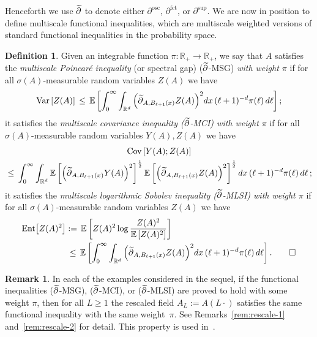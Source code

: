 \documentclass[11pt]{article}
\theoremstyle{definition}
\newtheorem{defi}[theo]{Definition}
\newtheorem{rema}[theo]{Remark}
\numberwithin{equation}{section}
\numberwithin{figure}{section}
\numberwithin{table}{section}
\newcommand{\R}{\mathbb R}
\newcommand{\expec}[1]{\mathbb{E}\left[#1 \right]}
\newcommand{\parfct}[1]{\partial_{#1}^{\operatorname{fct}}}
\newcommand{\parsup}[1]{\partial_{#1}^{\operatorname{\sup}}}
\newcommand{\osc}{\partial^{\mathrm{osc}}}
\newcommand{\var}[1]{\mathrm{Var}\left[#1\right]}
\newcommand{\ent}[1]{\mathrm{Ent}\!\left[#1\right]}
\newcommand{\cov}[2]{\mathrm{Cov}\left[#1;#2\right]}
\let\oldtilde\tilde
\renewcommand*{\tilde}[1]{\mathchoice{\widetilde{#1}}{\widetilde{#1}}{\oldtilde{#1}}{\oldtilde{#1}}}\let\oldhat\hat
\renewcommand*{\hat}[1]{\mathchoice{\widehat{#1}}{\widehat{#1}}{\oldhat{#1}}{\oldhat{#1}}}\let\oldexists\exists
\renewcommand*{\exists}{\mathrel{\oldexists}}
\begin{document}
Henceforth we use $\tilde\partial$ to denote either $\osc$, $\parfct{}$, or $\parsup{}$. We are now in position to define multiscale functional inequalities, which are multiscale weighted versions of standard functional inequalities in the probability space.
\begin{defi}\label{defi:TFI}
Given an integrable function $\pi:\R_+\to\R_+$, we say that $A$ satisfies the \emph{multiscale Poincaré inequality} (or spectral gap) ($\tilde \partial$-MSG) \emph{with weight $\pi$} if for all $\sigma(A)$-measurable random variables $Z(A)$ we have
\begin{align*}
\var{Z(A)}\,\le \,\expec{\int_0^\infty \int_{\R^d}\Big(\tilde\partial_{A,B_{\ell+1}(x)}Z(A)\Big)^{2}dx\,(\ell+1)^{-d}\pi(\ell)\,d\ell};
\end{align*}
it satisfies the \emph{multiscale covariance inequality \emph{($\tilde\partial$-MCI)} with weight $\pi$} if for all $\sigma(A)$-measurable random variables $Y(A),Z(A)$ we have
\begin{multline*}
\cov{Y(A)}{Z(A)}\\
\,\le\, \int_0^\infty \int_{\R^d}\expec{\Big(\tilde\partial_{A,B_{\ell+1}(x)}Y(A)\Big)^2}^{\frac12}\expec{\Big(\tilde\partial_{A,B_{\ell+1}(x)}Z(A)\Big)^2}^{\frac12}dx \,(\ell+1)^{-d}\pi(\ell)\,d\ell\,;
\end{multline*}
it satisfies the \emph{multiscale logarithmic Sobolev inequality \emph{($\tilde\partial$-MLSI)} with weight $\pi$} if for all $\sigma(A)$-measurable random variables $Z(A)$ we have
\begin{align*}
\ent{Z(A)^2}&:=\,\expec{Z(A)^2\log\frac{Z(A)^2}{\expec{Z(A)^2}}}\\
&\,\le\,\expec{\int_0^\infty \int_{\R^d}\Big(\tilde\partial_{A,B_{\ell+1}(x)}Z(A)\Big)^{2}dx\,(\ell+1)^{-d}\pi(\ell)\,d\ell}.\qedhere
\end{align*}
\end{defi}

\begin{rema}\label{rem:proofplus}
In each of the examples considered in the sequel, if the functional inequalities ($\tilde\partial$-MSG), ($\tilde\partial$-MCI), or ($\tilde\partial$-MLSI) are proved to hold with some weight $\pi$, then for all $L\ge1$ the rescaled field $A_L:=A(L\cdot)$ satisfies the same functional inequality with the same weight~$\pi$. See Remarks~\ref{rem:rescale-1} and~\ref{rem:rescale-2} for detail. This property is used in~\cite{GNO-reg}.
\end{rema}
\end{document}
